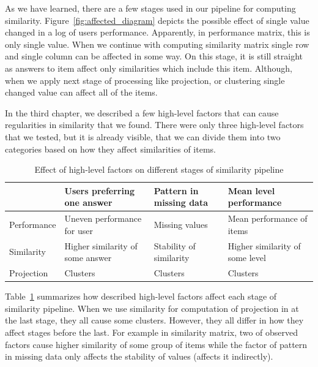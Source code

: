 \documentclass[
  printed, %
  table,   %
  nolof,     %
  nolot,     %
  color,
  final,
  nocover
]{fithesis3}
\begin{document}

As we have learned, there are a few stages used in our pipeline for computing similarity. Figure~\ref{fig:affected_diagram} depicts the possible effect of single value changed in a log of users performance. Apparently, in performance matrix, this is only single value. When we continue with computing similarity matrix single row and single column can be affected in some way. On this stage, it is still straight as answers to item affect only similarities which include this item. Although, when we apply next stage of processing like projection, or clustering single changed value can affect all of the items.


In the third chapter, we described a few high-level factors that can cause regularities in similarity that we found. There were only three high-level factors that we tested, but it is already visible, that we can divide them into two categories based on how they affect similarities of items.

\begin{table}
  \setlength{\tabcolsep}{0.12em} %
  {\scriptsize\renewcommand{\arraystretch}{1.0}%
    \begin{tabular}{ | l | l l l | }
      \hline
      \cellcolor[gray]{1.0} & Users preferring one answer      & Pattern in missing data & Mean level performance            \\
      \hline
      Performance           & Uneven performance for user      & Missing values          & Mean performance of items         \\
      Similarity            & Higher similarity of some answer & Stability of similarity & Higher similarity of some level   \\
      Projection            & Clusters                         & Clusters                & Clusters                          \\
      \hline
    \end{tabular}
  }
  \caption{Effect of high-level factors on different stages of similarity pipeline}
  \label{tab:effect-of-factors-on-stages}
\end{table}

Table~\ref{tab:effect-of-factors-on-stages} summarizes how described high-level factors affect each stage of similarity pipeline. When we use similarity for computation of projection in at the last stage, they all cause some clusters. However, they all differ in how they affect stages before the last. For example in similarity matrix, two of observed factors cause higher similarity of some group of items while the factor of pattern in missing data only affects the stability of values (affects it indirectly).
\end{document}
